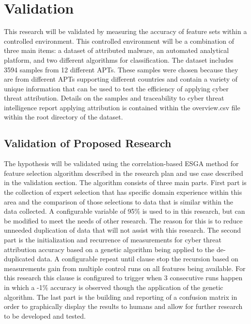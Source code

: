 \documentclass[12pt]{report}
\begin{document}

\section{Validation}
This research will be validated by measuring the accuracy of feature sets within a controlled environment.  This controlled environment will be a combination of three main items: a dataset of attributed malware, an automated analytical platform, and two different algorithms for classification.  The dataset includes 3594 samples from 12 different APTs. \cite{APTMalware2022}  These samples were chosen because they are from different APTs supporting different countries and contain a variety of unique information that can be used to test the efficiency of applying cyber threat attribution.  Details on the samples and traceability to cyber threat intelligence report applying attribution is contained within the overview.csv file within the root directory of the dataset.  

\subsection{Validation of Proposed Research}
The hypothesis will be validated using the correlation-based ESGA method for feature selection algorithm described in the research plan and use case described in the validation section.  The algorithm consists of three main parts.  First part is the collection of expert selection that has specific domain experience within this area and the comparison of those selections to data that is similar within the data collected.  A configurable variable of 95\% is used to in this research, but can be modified to meet the needs of other research.  The reason for this is to reduce unneeded duplication of data that will not assist with this research.  The second part is the initialization and recurrence of measurements for cyber threat attribution accuracy based on a genetic algorithm being applied to the de-duplicated data.  A configurable repeat until clause stop the recursion based on measurements gain from multiple control runs on all features being available.  For this research this clause is configured to trigger when 3 consecutive runs happen in which a -1\% accuracy is observed though the application of the genetic algorithm.  The last part is the building and reporting of a confusion matrix in order to graphically display the results to humans and allow for further research to be developed and tested.
\end{document}
